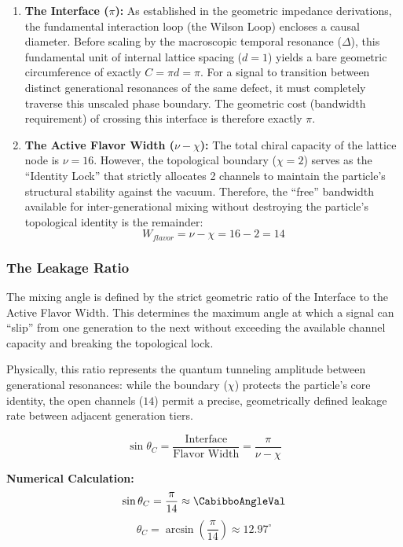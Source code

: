 \begin{enumerate}
    \item \textbf{The Interface ($\pi$):} As established in the geometric impedance derivations, the fundamental interaction loop (the Wilson Loop) encloses a causal diameter. Before scaling by the macroscopic temporal resonance ($\Delta$), this fundamental unit of internal lattice spacing ($d=1$) yields a bare geometric circumference of exactly $C = \pi d = \pi$. For a signal to transition between distinct generational resonances of the same defect, it must completely traverse this unscaled phase boundary. The geometric cost (bandwidth requirement) of crossing this interface is therefore exactly $\pi$.
    
    \item \textbf{The Active Flavor Width ($\nu - \chi$):} The total chiral capacity of the lattice node is $\nu=16$. However, the topological boundary ($\chi=2$) serves as the ``Identity Lock'' that strictly allocates 2 channels to maintain the particle's structural stability against the vacuum. Therefore, the ``free'' bandwidth available for inter-generational mixing without destroying the particle's topological identity is the remainder:
    \begin{equation}
        W_{flavor} = \nu - \chi = 16 - 2 = 14
    \end{equation}
\end{enumerate}

\subsubsection{The Leakage Ratio}
The mixing angle is defined by the strict geometric ratio of the Interface to the Active Flavor Width. This determines the maximum angle at which a signal can ``slip'' from one generation to the next without exceeding the available channel capacity and breaking the topological lock. 

Physically, this ratio represents the quantum tunneling amplitude between generational resonances: while the boundary ($\chi$) protects the particle's core identity, the open channels ($14$) permit a precise, geometrically defined leakage rate between adjacent generation tiers.

\begin{equation}
\sin \theta_C = \frac{\text{Interface}}{\text{Flavor Width}} = \frac{\pi}{\nu - \chi}
\end{equation}

\textbf{Numerical Calculation:}
\begin{equation}
\sin \theta_C = \frac{\pi}{14} \approx \mathbf{\CabibboAngleVal}
\end{equation}
\begin{equation}
\theta_C = \arcsin\left(\frac{\pi}{14}\right) \approx 12.97^\circ
\end{equation}

